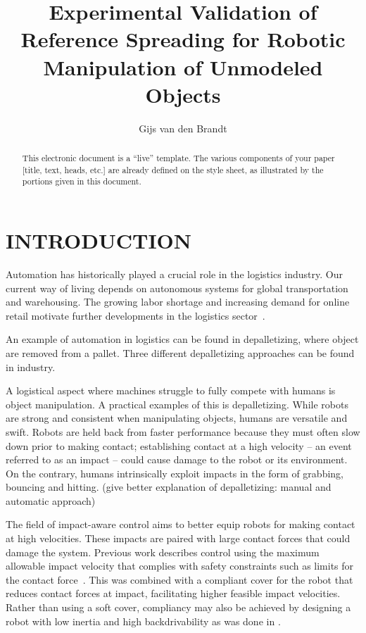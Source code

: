\documentclass[a4paper, 10pt, conference]{ieeeconf}
\title{\LARGE \bf
    Experimental Validation of Reference Spreading for Robotic Manipulation of Unmodeled Objects
    }
\author{Gijs van den Brandt%
    }
\begin{document}
    \maketitle
    \thispagestyle{empty}
    \pagestyle{empty}

    \begin{abstract}

    This electronic document is a ``live'' template. The various components of your paper [title, text, heads, etc.] are already defined on the style sheet, as illustrated by the portions given in this document.

    \end{abstract}

    \section{INTRODUCTION}

    Automation has historically played a crucial role in the logistics industry. Our current way of living depends on autonomous systems for global transportation and warehousing. The growing labor shortage and increasing demand for online retail motivate further developments in the logistics sector~\cite{dekhneAutomationLogisticsBig2019}.

    An example of automation in logistics can be found in depalletizing, where object are removed from a pallet. Three different depalletizing approaches can be found in industry. 

    A logistical aspect where machines struggle to fully compete with humans is object manipulation. A practical examples of this is depalletizing. While robots are strong and consistent when manipulating objects, humans are versatile and swift. Robots are held back from faster performance because they must often slow down prior to making contact; establishing contact at a high velocity -- an event referred to as an impact -- could cause damage to the robot or its environment. On the contrary, humans intrinsically exploit impacts in the form of grabbing, bouncing and hitting. (give better explanation of depalletizing: manual and automatic approach)

    The field of impact-aware control aims to better equip robots for making contact at high velocities. These impacts are paired with large contact forces that could damage the system. Previous work describes control using the maximum allowable impact velocity that complies with safety constraints such as limits for the contact force~\cite{dehioRobotSafeImpactsSoft2021, dehioDualArmBoxGrabbing2022}. This was combined with a compliant cover for the robot that reduces contact forces at impact, facilitating higher feasible impact velocities. Rather than using a soft cover, compliancy may also be achieved by designing a robot with low inertia and high backdrivability as was done in \cite{songDevelopmentLowInertiaHighStiffness2018}.
\end{document}
